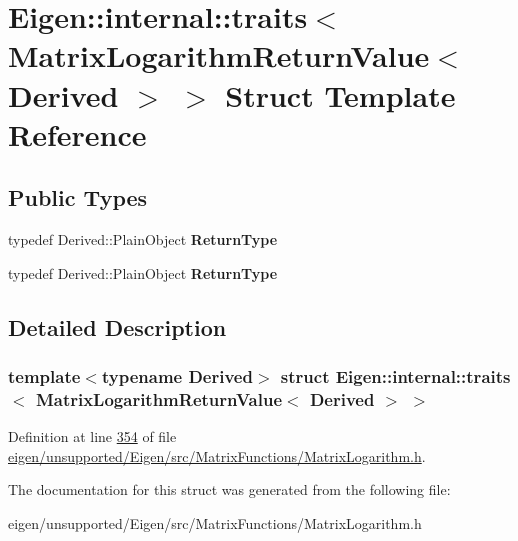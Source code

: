 \hypertarget{struct_eigen_1_1internal_1_1traits_3_01_matrix_logarithm_return_value_3_01_derived_01_4_01_4}{}\section{Eigen\+:\+:internal\+:\+:traits$<$ Matrix\+Logarithm\+Return\+Value$<$ Derived $>$ $>$ Struct Template Reference}
\label{struct_eigen_1_1internal_1_1traits_3_01_matrix_logarithm_return_value_3_01_derived_01_4_01_4}
\subsection*{Public Types}
\begin{DoxyCompactItemize}
\item 
\mbox{\label{struct_eigen_1_1internal_1_1traits_3_01_matrix_logarithm_return_value_3_01_derived_01_4_01_4_acd70743f84339e74aeecdac7bef4ebad}} 
typedef Derived\+::\+Plain\+Object {\bfseries Return\+Type}
\item 
\mbox{\label{struct_eigen_1_1internal_1_1traits_3_01_matrix_logarithm_return_value_3_01_derived_01_4_01_4_acd70743f84339e74aeecdac7bef4ebad}} 
typedef Derived\+::\+Plain\+Object {\bfseries Return\+Type}
\end{DoxyCompactItemize}


\subsection{Detailed Description}
\subsubsection*{template$<$typename Derived$>$\newline
struct Eigen\+::internal\+::traits$<$ Matrix\+Logarithm\+Return\+Value$<$ Derived $>$ $>$}



Definition at line \hyperlink{eigen_2unsupported_2_eigen_2src_2_matrix_functions_2_matrix_logarithm_8h_source_l00354}{354} of file \hyperlink{eigen_2unsupported_2_eigen_2src_2_matrix_functions_2_matrix_logarithm_8h_source}{eigen/unsupported/\+Eigen/src/\+Matrix\+Functions/\+Matrix\+Logarithm.\+h}.



The documentation for this struct was generated from the following file\+:\begin{DoxyCompactItemize}
\item 
eigen/unsupported/\+Eigen/src/\+Matrix\+Functions/\+Matrix\+Logarithm.\+h\end{DoxyCompactItemize}
